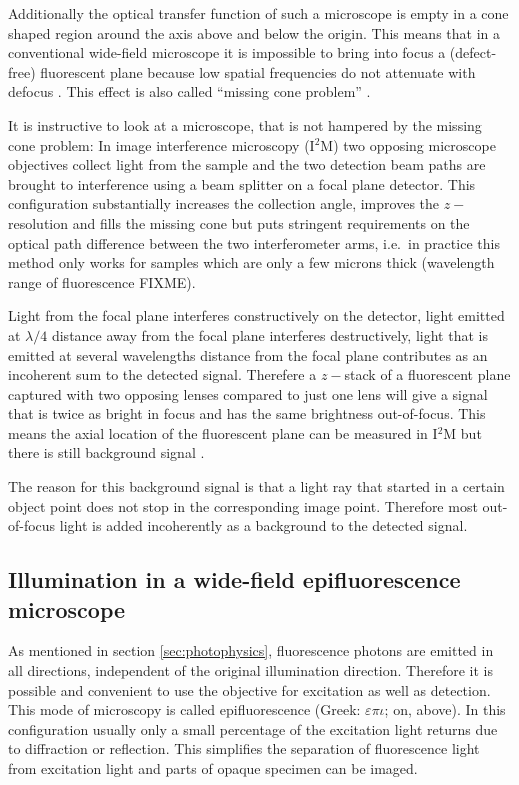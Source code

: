 Additionally the optical transfer function of such a microscope is
empty in a cone shaped region around the axis above and below the
origin.  This means that in a conventional wide-field microscope it is
impossible to bring into focus a (defect-free) fluorescent plane
because low spatial frequencies do not attenuate with defocus
\citep{Neil1997}. This effect is also called ``missing cone problem''
\citep{Streibl1984}.

It is instructive to look at a microscope, that is not hampered by the
missing cone problem: In image interference microscopy (I${}^2$M) two
opposing microscope objectives collect light from the sample and the
two detection beam paths are brought to interference using a beam
splitter on a focal plane detector. This configuration substantially
increases the collection angle, improves the $z-$resolution and fills
the missing cone but puts stringent requirements on the optical path
difference between the two interferometer arms, i.e.\ in practice this
method only works for samples which are only a few microns thick
\citep{Gustafsson1999} (wavelength range of fluorescence FIXME).  


Light from the focal plane interferes constructively on the detector,
light emitted at $\lambda/4$ distance away from the focal plane
interferes destructively, light that is emitted at several wavelengths
distance from the focal plane contributes as an incoherent sum to the
detected signal. Therefere a $z-$stack of a fluorescent plane captured
with two opposing lenses compared to just one lens will give a signal
that is twice as bright in focus and has the same brightness
out-of-focus. This means the axial location of the fluorescent plane
can be measured in I${}^2$M but there is still background signal
\citep{Gustafsson1995}.

The reason for this background signal is that a light ray that started
in a certain object point does not stop in the corresponding image
point. Therefore most out-of-focus light is added incoherently as a
background to the detected signal.


\subsection{Illumination in a wide-field epifluorescence microscope}
As mentioned in section \ref{sec:photophysics}, fluorescence photons
are emitted in all directions, independent of the original
illumination direction. Therefore it is possible and convenient to use
the objective for excitation as well as detection. This mode of
microscopy is called epifluorescence (Greek: $\varepsilon\pi\iota$;
on, above).  In this configuration usually only a small percentage of
the excitation light returns due to diffraction or reflection. This
simplifies the separation of fluorescence light from excitation light
and parts of opaque specimen can be imaged.

